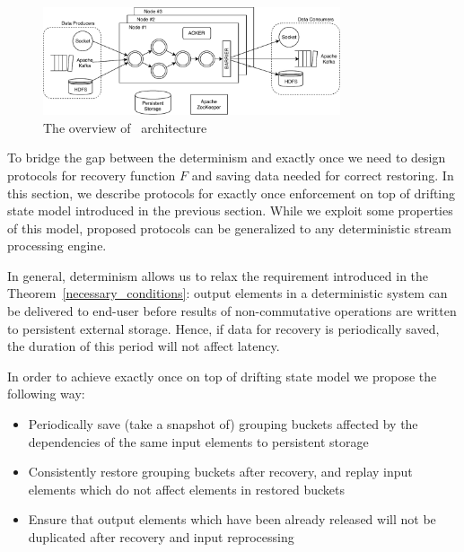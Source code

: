 
\label {fs-consistency-section}

\begin{figure}[htbp]
  \centering
  \includegraphics[width=0.78\textwidth]{pics/arch}
  \caption{The overview of \FlameStream\ architecture}
  \label {arch}
\end{figure}

To bridge the gap between the determinism and exactly once we need to design protocols for recovery function $F$ and saving data needed for correct restoring. In this section, we describe protocols for exactly once enforcement on top of drifting state model introduced in the previous section. While we exploit some properties of this model, proposed protocols can be generalized to any deterministic stream processing engine.

In general, determinism allows us to relax the requirement introduced in the Theorem~\ref{necessary_conditions}: output elements in a deterministic system can be delivered to end-user before results of non-commutative operations are written to persistent external storage. Hence, if data for recovery is periodically saved, the duration of this period will not affect latency.

In order to achieve exactly once on top of drifting state model we propose the following way:
\begin{itemize}
    \item Periodically save (take a snapshot of) grouping buckets affected by the dependencies of the same input elements to persistent storage
    \item Consistently restore grouping buckets after recovery, and replay input elements which do not affect elements in restored buckets
    \item Ensure that output elements which have been already released will not be duplicated after recovery and input reprocessing
\end{itemize}

